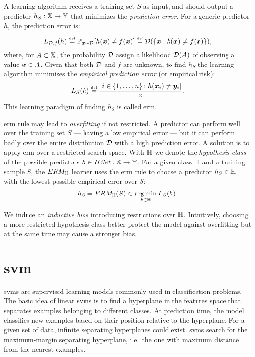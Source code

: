 A learning algorithm receives a training set $S$ as input, and should
output a predictor $h_S:\mathbb{X}\rightarrow\mathbb{Y}$ that minimizes the
\emph{prediction error}. For a generic predictor $h$, the prediction
error is:
\begin{equation}\label{predictionError}
  L_{\mathcal{D},f}(h)\overset{\underset{\mathrm{def}}{}}{=}\mathbb{P}_{\bm{x}\sim\mathcal{D}}[h(\bm{x})\neq
  f(\bm{x})]\overset{\underset{\mathrm{def}}{}}{=}\mathcal{D}(\{\bm{x}:h(\bm{x})\neq
  f(\bm{x})\}),
\end{equation}
where, for $A\subset\mathbb{X}$, the probability $\mathcal{D}$ assign a
likelihood $\mathcal{D}(A)$ of observing a value $\bm{x}\in A$. Given
that both $\mathcal{D}$ and $f$ are unknown, to find $h_S$ the learning
algorithm minimizes the \emph{empirical prediction error} (or
empirical risk):
\begin{equation}\label{empiricalError}
  L_S(h)\overset{\underset{\mathrm{def}}{}}{=}\frac{|i\in\{1,\dots,n\}:h(\bm{x}_i)\neq\bm{y}_i|}{n}.
\end{equation}
This learning paradigm of finding $h_S$ is called \ac{erm}.

\ac{erm} rule may lead to \emph{overfitting} if not restricted. A predictor
can perform well over the training set $S$ --- having a low empirical
error --- but it can perform badly over the entire distribution
$\mathcal{D}$ with a high prediction error. A solution is to apply
\ac{erm} over a restricted search space. With $\mathbb{H}$ we denote the
\emph{hypothesis class} of the possible predictors
$h\in{HSet}:\mathbb{X}\rightarrow\mathbb{Y}$. For a given class $\mathbb{H}$ and a
training sample $S$, the $ERM_{\mathbb{H}}$ learner uses the \ac{erm} rule to
choose a predictor $h_S\in\mathbb{H}$ with the lowest possible empirical
error over $S$:
\begin{equation*}
  h_S=ERM_{\mathbb{H}}(S)\in \operatorname*{arg\,min}_{h\in\mathbb{H}} L_S(h).
\end{equation*}

We induce an \emph{inductive bias} introducing restrictions over
$\mathbb{H}$. Intuitively, choosing a more restricted hypothesis class
better protect the model against overfitting but at the same time may cause
a stronger bias.


\section{\acf{svm}}
\acp{svm} \cite{cortes-support-1995} are supervised learning models
commonly used in classification problems. The basic idea of linear
\acp{svm} is to find a hyperplane in the features space that separates
examples belonging to different classes. At prediction time, the model
classifies new examples based on their position relative to the
hyperplane. For a given set of data, infinite separating hyperplanes
could exist. \acp{svm} search for the maximum-margin separating
hyperplane, i.e.\ the one with maximum distance from the nearest
examples.

